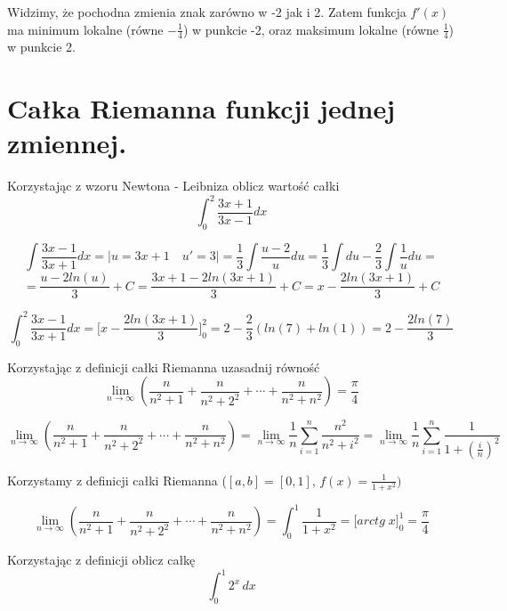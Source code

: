 \documentclass[12pt]{article}
\begin{document}
        Widzimy, że pochodna zmienia znak zarówno w -2 jak i 2. Zatem funkcja $f'(x)$ ma minimum lokalne 
        (równe $-\frac{1}{4}$) w punkcie -2, oraz maksimum lokalne (równe $\frac{1}{4}$) w punkcie 2.
        
    \newpage

    \section{Całka Riemanna funkcji jednej zmiennej.}
    
    \begin{exercise}
        Korzystając z wzoru Newtona - Leibniza oblicz wartość całki $$\int_0^2 \frac{3x + 1}{3x - 1}dx$$
    \end{exercise}
    
    $$\int\frac{3x - 1}{3x + 1} dx = \big| u = 3x + 1 \quad u' = 3\big| = \frac{1}{3}\int \frac{u - 2}{u}du 
    	= \frac{1}{3} \int du - \frac{2}{3}\int\frac{1}{u}du =$$
    $$= \frac{u - 2ln(u)}{3} + C = \frac{3x + 1 - 2ln(3x + 1)}{3} + C = x - \frac{2ln(3x + 1)}{3} + C$$
    
    $$\int_0^2\frac{3x - 1}{3x + 1} dx = \big[ x - \frac{2ln(3x + 1)}{3} \big]^2_0 = 2 - \frac{2}{3}(ln(7) + ln(1)) = 2 - \frac{2ln(7)}{3}$$  

    \begin{exercise}
        Korzystając z definicji całki Riemanna uzasadnij równość $$\lim_{n \rightarrow \infty} (\frac{n}{n^2 + 1} + \frac{n}{n^2 + 2^2} + \cdots + \frac{n}{n^2 + n^2}) = \frac{\pi}{4}$$
    \end{exercise}
    
    $$\lim_{n \rightarrow \infty} (\frac{n}{n^2 + 1} + \frac{n}{n^2 + 2^2} + \cdots + \frac{n}{n^2 + n^2}) = 
    \lim_{n \rightarrow \infty} \frac{1}{n} \sum_{i =1}^{n} \frac{n^2}{n^2 + i^2} = \lim_{n \rightarrow \infty} \frac{1}{n} \sum_{i =1}^{n} \frac{1}{1 + (\frac{i}{n})^2} $$
    
    Korzystamy z definicji całki Riemanna ($[a, b] = [0, 1]$, $f(x) = \frac{1}{1 + x^2})$
    
    $$\lim_{n \rightarrow \infty} (\frac{n}{n^2 + 1} + \frac{n}{n^2 + 2^2} + \cdots + \frac{n}{n^2 + n^2}) = \int_0^1 \frac{1}{1 + x^2}= \big[arctg \; x \big]^1_0 = \frac{\pi}{4}$$
    
    \begin{exercise}
        Korzystając z definicji oblicz całkę
        $$\int_0^1 2^x \,dx$$
    \end{exercise}
\end{document}
